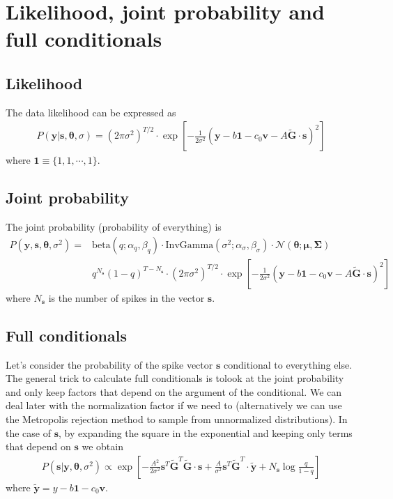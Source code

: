 \documentclass{article}
\theoremstyle{remark}
\begin{document}
\section{Likelihood, joint probability and full conditionals}
\subsection{Likelihood}
The data likelihood can be expressed as
\begin{align}
    P(\bm{y} | \bm{s}, \bm{\theta},\sigma) = (2\pi\sigma^2)^{T/2}\cdot \exp\left[-\frac{1}{2\sigma^2}(\bm{y}-b\bm{1} - c_0 \bm{v}-A\bm{\tilde G}\cdot \bm{s})^2\right]
\end{align}
where $\bm{1}\equiv \lbrace 1,1,\cdots,1\rbrace$. 

\subsection{Joint probability}
The joint probability (probability of everything) is
\begin{align}
    P(\bm{y},\bm{s},\bm{\theta},\sigma^2) =& \mathrm{beta}(q; \alpha_q,\beta_q)\cdot \mathrm{InvGamma}(\sigma^2;\alpha_\sigma,\beta_\sigma)\cdot \mathcal{N}(\bm{\theta};\bm{\mu},\bm{\Sigma})\nonumber\\
    &q^{N_{\bm{s}}}(1-q)^{T-N_{\bm{s}}}\cdot (2\pi\sigma^2)^{T/2}\cdot \exp\left[-\frac{1}{2\sigma^2}(\bm{y}-b\bm{1} - c_0 \bm{v}-A\bm{\tilde G}\cdot \bm{s})^2\right]\label{eq:joint}
\end{align}
where $N_{\bm{s}}$ is the number of spikes in the vector $\bm{s}$.
\subsection{Full conditionals}
Let's consider the probability of the spike vector $\bm{s}$ conditional to everything else. The general trick to calculate full conditionals is tolook at the joint probability and only keep factors that depend on the argument of the conditional. We can deal later with the normalization factor if we need to (alternatively we can use the Metropolis rejection method to sample from unnormalized distributions). In the case of $\bm{s}$, by expanding the square in the exponential and keeping only terms that depend on $\bm{s}$ we obtain
\begin{align}
    P(\bm{s}|\bm{y},\bm{\theta},\sigma^2) \propto \exp\left[-\frac{A^2}{2\sigma^2}\bm{s}^T\bm{\tilde G}^T\bm{\tilde G}\cdot \bm{s}+\frac{A}{\sigma^2}\bm{s}^T\bm{\tilde G}^T\cdot\bm{\tilde y}+N_{\bm{s}}\log\frac{q}{1-q}\right] \label{eq:fc_s}
\end{align}
where $\bm{\tilde y}=y-b\bm{1}-c_0\bm{v}$. 
\end{document}
